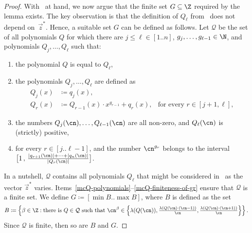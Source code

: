 \begin{proof}
    With~ at hand, we now argue that the
    finite set $G \subseteq \Z$ required by the lemma exists.
    The key observation is that the definition of $Q_\ell$ from~ does not depend on~$\vec z^*$. 
    Hence, a suitable set $G$ can be defined as follows. 
    Let $\mathcal{Q}$ be the set of all polynomials $Q$
    for which there are $j \leq \ell \in [1..n]$, $g_j,\dots,g_{\ell-1} \in \N$, and polynomials $Q_j,\dots,Q_{\ell}$ 
    such that:
      \begin{enumerate}
        \item the polynomial $Q$ is equal to $Q_\ell$,
        \item\label{mcQ-polynomials} the polynomials $Q_j^{},\dots,Q_\ell$ are defined as 
            \begin{align*}
            Q_j(x) & \coloneqq q_j(x),                                  \\
            Q_r(x) & \coloneqq Q_{r-1}(x) \cdot x^{g_{r-1}} + q_{r}(x),
                & \text{for every } r \in [j+1,\ell],
            \end{align*}
        \item
        the numbers $Q_j(\cn),\dots,Q_{\ell-1}(\cn)$ are all non-zero, and
        $Q_\ell(\cn)$ is (strictly) positive,
        \item\label{mcQ-finiteness-of-gr}
        for every $r \in [j..\ell-1]$, and
        the number $\cn^{g_r}$ belongs to the interval
        $\big[1\,,\,\frac{\abs{q_{r+1}(\cn)}+\cdots+\abs{q_n(\cn)}}{\abs{Q_r(\cn)}}\big]$.
      \end{enumerate}
    In a nutshell, $\mathcal{Q}$ contains all polynomials $Q_\ell$ that might be considered in~ as the vector $\vec z^*$ varies. Items~\ref{mcQ-polynomials}--\ref{mcQ-finiteness-of-gr} ensure that $\mathcal{Q}$ is a finite set.
    We define $G \coloneqq [\min B.. \max B]$, where $B$ is defined as the set
    \[ 
      B \coloneqq \left\{ \beta \in \Z : \text{there is } Q \in \mathcal{Q} \text{ such that } \cn^{\beta} \in \Big\{{\textstyle\lambda(Q(\cn)), \frac{\lambda(Q(\cn) \cdot (\cn-1))}{\cn}, \frac{\lambda(Q(\cn) \cdot (\cn+1))}{\cn}}\Big\}
      \right\}.
    \]
    Since $\mathcal{Q}$ is finite, then so are $B$ and $G$.


\end{proof}
